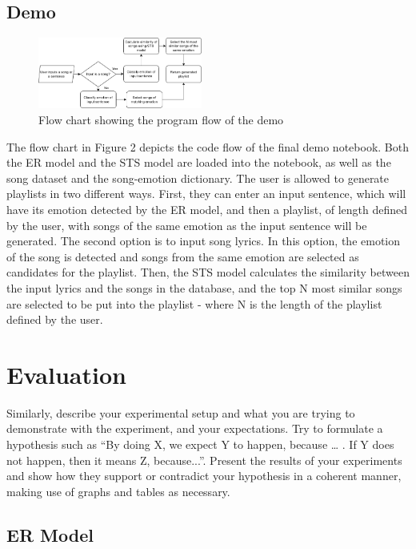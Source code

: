 \documentclass[11pt]{article}
\begin{document}
\subsection{Demo}
\begin{figure}[H]
    \centering
    \includegraphics[width=0.48\textwidth]{images/DemoFlow.png}
    \caption{Flow chart showing the program flow of the demo}
\end{figure}

The flow chart in Figure 2 depicts the code flow of the final demo notebook. Both the ER model and the STS model are loaded into the notebook, as well as the song dataset and the song-emotion dictionary. The user is allowed to generate playlists in two different ways. First, they can enter an input sentence, which will have its emotion detected by the ER model, and then a playlist, of length defined by the user, with songs of the same emotion as the input sentence will be generated. The second option is to input song lyrics. In this option, the emotion of the song is detected and songs from the same emotion are selected as candidates for the playlist. Then, the STS model calculates the similarity between the input lyrics and the songs in the database, and the top N most similar songs are selected to be put into the playlist - where N is the length of the playlist defined by the user.

\section{Evaluation}
Similarly, describe your experimental setup and what you are trying to demonstrate with the experiment, and your expectations. Try to formulate a hypothesis such as ``By doing X, we expect Y to happen, because … . If Y does not happen, then it means Z, because...''. Present the results of your experiments and show how they support or contradict your hypothesis in a coherent manner, making use of graphs and tables as necessary. 

\subsection{ER Model}
\end{document}
